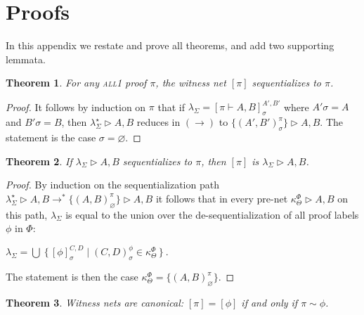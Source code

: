 \documentclass[UKenglish]{lipics-v2019}
\newcommand\all{\textsc{all}}
\newcommand\+{+}
\renewcommand\*{\times}
\newcommand\prf[3]{#1\vdash\!#2,#3}
\newcommand\net[3]{#1\triangleright #2,#3}
\newcommand\deseq[4][\sigma]{[#2]_{#1}^{#3,#4}}
\newcommand\link[3][\sigma]{(#2,#3)_{#1}}
\newcommand\scoal{\rightarrow} %
\begin{document}
\theoremstyle{plain}
\newtheorem{retheorem}{Theorem}
\newtheorem{relemma}[retheorem]{Lemma}

\section{Proofs}

In this appendix we restate and prove all theorems, and add two supporting lemmata.

\addtocounter{retheorem}{-1}
\begin{retheorem}
For any \all{\textnormal 1} proof $\pi$, the witness net $[\pi]$ sequentializes to $\pi$. 
\end{retheorem}

\begin{proof}
It follows by induction on $\pi$ that if $\lambda_\Sigma=\deseq{\prf\pi AB}{A'}{B'}$ where $A'\sigma=A$ and $B'\sigma=B$, then $\net{\lambda^\star_\Sigma}AB$ reduces in $(\scoal)$ to $\net{\{\link{A'}{B'}^\pi\}}AB$. The statement is the case $\sigma=\varnothing$.
\end{proof}

\addtocounter{retheorem}{-1}
\begin{retheorem}
If $\net{\lambda_\Sigma}AB$ sequentializes to $\pi$, then $[\pi]$ is $\net{\lambda_\Sigma}AB$. 
\end{retheorem}

\begin{proof}
By induction on the sequentialization path 
$\net{\lambda_\Sigma^\star}AB\scoal^*\net{\{\link[\varnothing]AB^\pi\}}AB$
it follows that in every pre-net $\net{\kappa_\Theta^\Phi}AB$ on this path, $\lambda_\Sigma$ is equal to the union over the de-sequentialization of all proof labels $\phi$ in $\Phi$:
\begin{center}\(
	\lambda_\Sigma=\bigcup~\{\,\deseq\phi CD \mid \link CD^\phi \in \kappa_\Theta^\Phi\,\}~.
\)\end{center}
The statement is then the case $\kappa_\Theta^\Phi=\{\link[\varnothing]AB^\pi\}$.
\end{proof}

\addtocounter{retheorem}{-1}
\begin{retheorem}
Witness nets are canonical: $[\pi]=[\phi]$ if and only if $\pi\sim\phi$.
\end{retheorem}
\end{document}
